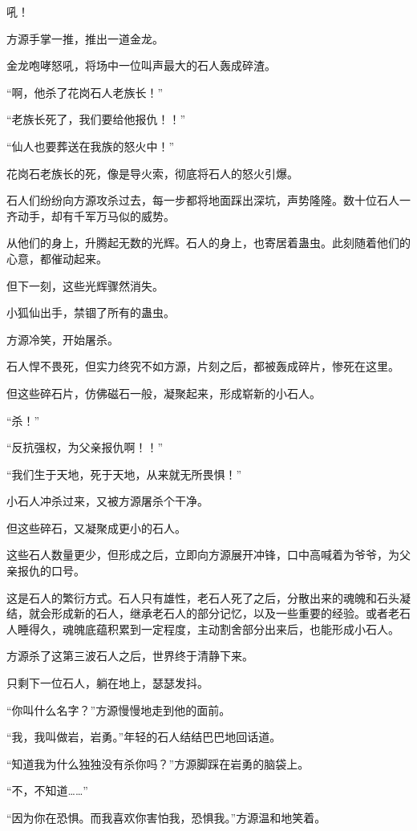 \begin{this_body}
吼！

方源手掌一推，推出一道金龙。

金龙咆哮怒吼，将场中一位叫声最大的石人轰成碎渣。

“啊，他杀了花岗石人老族长！”

“老族长死了，我们要给他报仇！！”

“仙人也要葬送在我族的怒火中！”

花岗石老族长的死，像是导火索，彻底将石人的怒火引爆。

石人们纷纷向方源攻杀过去，每一步都将地面踩出深坑，声势隆隆。数十位石人一齐动手，却有千军万马似的威势。

从他们的身上，升腾起无数的光辉。石人的身上，也寄居着蛊虫。此刻随着他们的心意，都催动起来。

但下一刻，这些光辉骤然消失。

小狐仙出手，禁锢了所有的蛊虫。

方源冷笑，开始屠杀。

石人悍不畏死，但实力终究不如方源，片刻之后，都被轰成碎片，惨死在这里。

但这些碎石片，仿佛磁石一般，凝聚起来，形成崭新的小石人。

“杀！”

“反抗强权，为父亲报仇啊！！”

“我们生于天地，死于天地，从来就无所畏惧！”

小石人冲杀过来，又被方源屠杀个干净。

但这些碎石，又凝聚成更小的石人。

这些石人数量更少，但形成之后，立即向方源展开冲锋，口中高喊着为爷爷，为父亲报仇的口号。

这是石人的繁衍方式。石人只有雄性，老石人死了之后，分散出来的魂魄和石头凝结，就会形成新的石人，继承老石人的部分记忆，以及一些重要的经验。或者老石人睡得久，魂魄底蕴积累到一定程度，主动割舍部分出来后，也能形成小石人。

方源杀了这第三波石人之后，世界终于清静下来。

只剩下一位石人，躺在地上，瑟瑟发抖。

“你叫什么名字？”方源慢慢地走到他的面前。

“我，我叫做岩，岩勇。”年轻的石人结结巴巴地回话道。

“知道我为什么独独没有杀你吗？”方源脚踩在岩勇的脑袋上。

“不，不知道……”

“因为你在恐惧。而我喜欢你害怕我，恐惧我。”方源温和地笑着。

\end{this_body}


